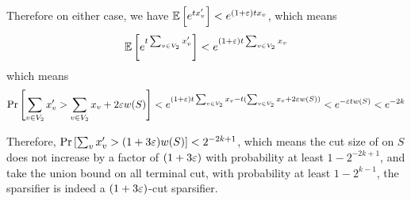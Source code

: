 Therefore on either case, we have ${\mathbb{E}}\left[ e^{tx'_v} \right]<e^{(1+{\varepsilon})tx_v}$, which means 
$${\mathbb{E}}\left[ e^{t\sum_{v\in V_2} x'_v} \right] < e^{(1+{\varepsilon})t\sum_{v\in V_2} x_v}$$ 
which means 
$$
\mathrm{Pr}\left[ \sum_{v\in V_2} x'_v > \sum_{v\in V_2} x_v + 2{\varepsilon} w(S) \right] < e^{(1+{\varepsilon})t\sum_{v\in V_2} x_v-t(\sum_{v \in V_2} x_v + 2{\varepsilon} w(S))}<e^{-{\varepsilon} t w(S)}<e^{-2k}
$$

Therefore, $\mathrm{Pr}\left[ \sum_v x'_v > (1+3{\varepsilon})w(S) \right] < 2^{-2k+1}$, which means the cut size of on $S$ does not increase by a factor of $(1+3{\varepsilon})$ with probability at least $1-2^{-2k+1}$, and take the union bound on all terminal cut, with probability at least $1-2^{k-1}$, the sparsifier is indeed a $(1+3{\varepsilon})$-cut sparsifier.

\fi

